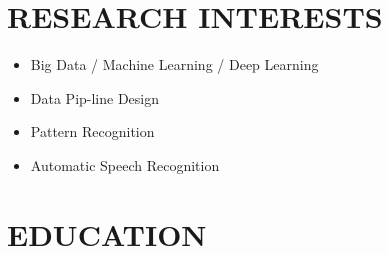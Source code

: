 \documentclass[10pt,a4paper,sans]{moderncv} %
\begin{document}
	
	\makecvtitle
	
	\section{RESEARCH INTERESTS}
	\begin{itemize}
		\item Big Data / Machine Learning / Deep Learning
		\item Data Pip-line Design
		\item Pattern Recognition
		\item Automatic Speech Recognition
	\end{itemize}
	
	\section{EDUCATION}
	
\end{document}
